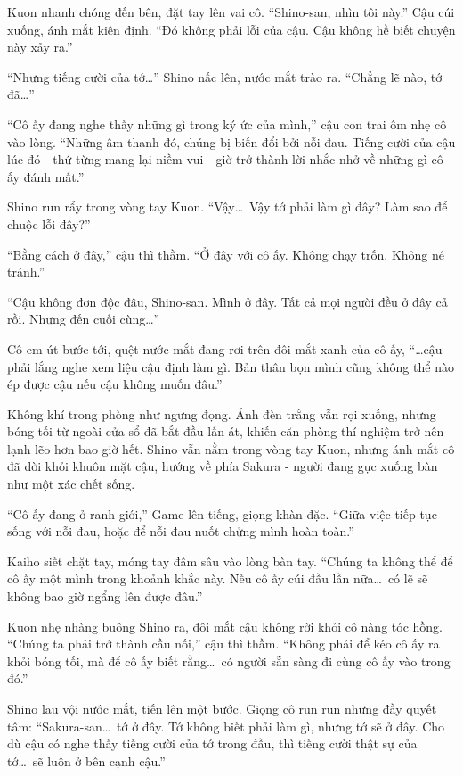 \documentclass[../main.tex]{subfiles}
\begin{document}
Kuon nhanh chóng đến bên, đặt tay lên vai cô. ``Shino-san, nhìn tôi này.'' Cậu cúi xuống, ánh mắt kiên định. ``Đó không phải lỗi của cậu. Cậu không hề biết chuyện này xảy ra.''

``Nhưng tiếng cười của tớ\dots'' Shino nấc lên, nước mắt trào ra. ``Chẳng lẽ nào, tớ đã\dots''

``Cô ấy đang nghe thấy những gì trong ký ức của mình,'' cậu con trai ôm nhẹ cô vào lòng. ``Những âm thanh đó, chúng bị biến đổi bởi nỗi đau. Tiếng cười của cậu lúc đó - thứ từng mang lại niềm vui - giờ trở thành lời nhắc nhở về những gì cô ấy đánh mất.''

Shino run rẩy trong vòng tay Kuon. ``Vậy\dots\ Vậy tớ phải làm gì đây? Làm sao để chuộc lỗi đây?''

``Bằng cách ở đây,'' cậu thì thầm. ``Ở đây với cô ấy. Không chạy trốn. Không né tránh.''

``Cậu không đơn độc đâu, Shino-san. Mình ở đây. Tất cả mọi người đều ở đây cả rồi. Nhưng đến cuối cùng\dots''

Cô em út bước tới, quệt nước mắt đang rơi trên đôi mắt xanh của cô ấy, ``\dots cậu phải lắng nghe xem liệu cậu định làm gì. Bản thân bọn mình cũng không thể nào ép được cậu nếu cậu không muốn đâu.''

Không khí trong phòng như ngưng đọng. Ánh đèn trắng vẫn rọi xuống, nhưng bóng tối từ ngoài cửa sổ đã bắt đầu lấn át, khiến căn phòng thí nghiệm trở nên lạnh lẽo hơn bao giờ hết. Shino vẫn nằm trong vòng tay Kuon, nhưng ánh mắt cô đã dời khỏi khuôn mặt cậu, hướng về phía Sakura - người đang gục xuống bàn như một xác chết sống.

``Cô ấy đang ở ranh giới,'' Game lên tiếng, giọng khàn đặc. ``Giữa việc tiếp tục sống với nỗi đau, hoặc để nỗi đau nuốt chửng mình hoàn toàn.''

Kaiho siết chặt tay, móng tay đâm sâu vào lòng bàn tay. ``Chúng ta không thể để cô ấy một mình trong khoảnh khắc này. Nếu cô ấy cúi đầu lần nữa\dots\ có lẽ sẽ không bao giờ ngẩng lên được đâu.''

Kuon nhẹ nhàng buông Shino ra, đôi mắt cậu không rời khỏi cô nàng tóc hồng. ``Chúng ta phải trở thành cầu nối,'' cậu thì thầm. ``Không phải để kéo cô ấy ra khỏi bóng tối, mà để cô ấy biết rằng\dots\ có người sẵn sàng đi cùng cô ấy vào trong đó.''

Shino lau vội nước mắt, tiến lên một bước. Giọng cô run run nhưng đầy quyết tâm: ``Sakura-san\dots\ tớ ở đây. Tớ không biết phải làm gì, nhưng tớ sẽ ở đây. Cho dù cậu có nghe thấy tiếng cười của tớ trong đầu, thì tiếng cười thật sự của tớ\dots\ sẽ luôn ở bên cạnh cậu.''
\end{document}
